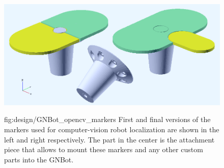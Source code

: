 \begin{figure}[h!]
\centerline{\mbox{\includegraphics[width=12cm]{images/design/GNBot_opencv_markers.png}}}
{fig:design/GNBot_opencv_markers}{
First and final versions of the markers used for computer-vision robot localization are shown in the left and right respectively. The part in the center is the attachment piece that allows to mount these markers and any other custom parts into the GNBot.
}\end{figure}








